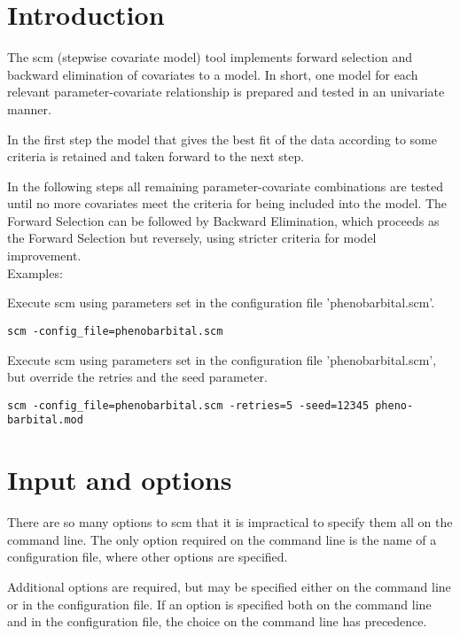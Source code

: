 
\usepackage{hyperref}


\maketitle
\newcommand{\guidetoolname}{scm}
\tableofcontents
\newpage

\section{Introduction}

The scm (stepwise covariate model) tool implements forward selection and backward elimination of covariates to a model. In short, one model for each relevant parameter-covariate relationship is prepared and tested in an univariate manner. 

In the first step the model that gives the best fit of the data according to some criteria is retained and taken forward to the next step. 

In the following steps all remaining parameter-covariate combinations are tested until no more covariates meet the criteria for being included into the model. The Forward Selection can be followed by Backward Elimination, which proceeds as the Forward Selection but reversely, using stricter criteria for model improvement. \\
Examples:

Execute scm using parameters set in the configuration file 'phenobarbital.scm'.
\begin{verbatim}
scm -config_file=phenobarbital.scm
\end{verbatim}

Execute scm using parameters set in the configuration file 'phenobarbital.scm', but override the retries and the seed
parameter. 
\begin{verbatim}
scm -config_file=phenobarbital.scm -retries=5 -seed=12345 pheno-
barbital.mod
\end{verbatim}

\section{Input and options}
There are so many options to scm that it is impractical to specify them all on the command line. The only option required on the command line is the name of a configuration file, where other options are specified. 

Additional options are required, but may be specified either on the command line or in the configuration file. If an option is specified both on the command line and in the configuration file, the choice on the command line has precedence. 

